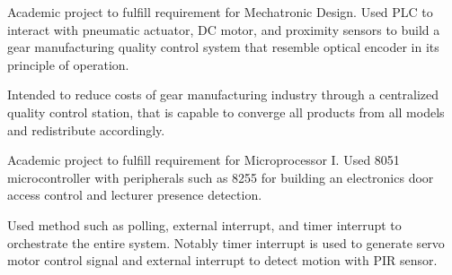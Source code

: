 \documentclass[letterpaper]{deedy-resume} %
\begin{document}
\begin{minipage}[t]{0.66\textwidth}
\vspace{\topsep}
\begin{tightitemize}
\item Academic project to fulfill requirement for Mechatronic Design. 
Used PLC to interact with pneumatic actuator, DC motor, and proximity sensors to build a gear manufacturing quality control system that resemble optical encoder in its principle of operation.
\item Intended to reduce costs of gear manufacturing industry through a centralized quality control station, that is capable to converge all products from all models and redistribute accordingly.
\end{tightitemize} 
\sectionspace %

\vspace{\topsep}
\begin{tightitemize}
\item Academic project to fulfill requirement for Microprocessor I. 
Used 8051 microcontroller with peripherals such as 8255 for building an electronics door access control and lecturer presence detection.
\item Used method such as polling, external interrupt, and timer interrupt to orchestrate the entire system.
Notably timer interrupt is used to generate servo motor control signal and external interrupt to detect motion with PIR sensor.
\end{tightitemize} 
\sectionspace %

\end{minipage}
\end{document}
